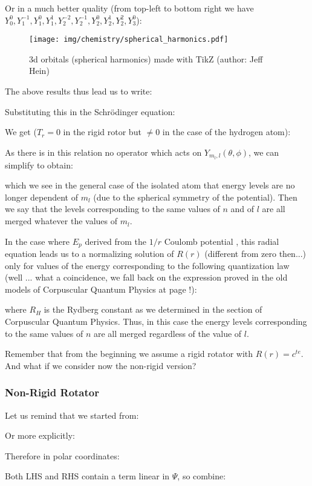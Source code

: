 	Or in a much better quality (from top-left to bottom right we have $Y_0^0, Y_1^{-1},Y_1^0,Y_1^1,Y_2^{-2},Y_2^{-1},Y_2^{0},Y_2^1,Y_2^2,Y_3^0$):
	\begin{figure}[H]
		\centering
		\texttt{[image: img/chemistry/spherical\_harmonics.pdf]}	
		\caption[]{3d orbitals (spherical harmonics) made with TikZ (author: Jeff Hein)}
	\end{figure}
	The above results thus lead us to write:
	
	Substituting this in the Schrödinger equation:
	
	We get ($T_r=0$ in the rigid rotor but $\neq 0$ in the case of the hydrogen atom):
	
	As there is in this relation no operator which acts on $Y_{m_l,l}(\theta,\phi)$, we can simplify to obtain:
	
	which we see in the general case of the isolated atom that energy levels are no longer dependent of $m_l$ (due to the spherical symmetry of the potential). Then we say that the levels corresponding to the same values of $n$ and of $l$ are all merged whatever the values of $m_l$.
	
	In the case where $E_p$ derived from the $1 / r$ Coulomb potential , this radial equation leads us to a normalizing solution of $R (r)$ (different from zero then...) only for values of the energy corresponding to the following quantization law (well ... what a coincidence, we fall back on the expression proved in the old models of Corpuscular Quantum Physics at page \pageref{Rydberg constant}!):
	
	where $R_H$ is the Rydberg constant as we determined in the section of Corpuscular Quantum Physics. Thus, in this case the energy levels corresponding to the same values of $n$ are all merged regardless of the value of $l$.

	Remember that from the beginning we assume a rigid rotator with $R(r)=c^{te}$. And what if we consider now the non-rigid version?
	
	\subsubsection{Non-Rigid Rotator}\label{quantum chemistry non-rigid rotator}
	Let us remind that we started from:
	
	Or more explicitly:
	
	Therefore in polar coordinates:
	
	Both LHS and RHS contain a term linear in $\Psi$, so combine:
	
